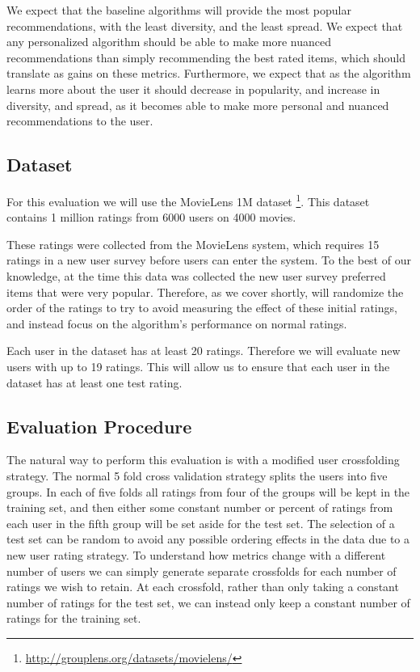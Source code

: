 \documentclass[letterpaper]{sig-alternate}
\begin{document}
  We expect that the baseline algorithms will provide the most popular recommendations, with the least diversity, and the least spread.
  We expect that any personalized algorithm should be able to make more nuanced recommendations than simply recommending the best rated items, which should translate as gains on these metrics.
  Furthermore, we expect that as the algorithm learns more about the user it should decrease in popularity, and increase in diversity, and spread, as it becomes able to make more personal and nuanced recommendations to the user.


  \subsection*{Dataset}

  For this evaluation we will use the MovieLens 1M dataset \footnote{\url{http://grouplens.org/datasets/movielens/}}.
  This dataset contains 1 million ratings from 6000 users on 4000 movies.
  
  These ratings were collected from the MovieLens system, which requires 15 ratings in a new user survey before users can enter the system.
  To the best of our knowledge, at the time this data was collected the new user survey preferred items that were very popular.
  Therefore, as we cover shortly, will randomize the order of the ratings to try to avoid measuring the effect of these initial ratings, and instead focus on the algorithm's performance on normal ratings.
  
  Each user in the dataset has at least 20 ratings.
  Therefore we will evaluate new users with up to 19 ratings.
  This will allow us to ensure that each user in the dataset has at least one test rating.

  
  \subsection*{Evaluation Procedure}

  The natural way to perform this evaluation is with a modified user crossfolding strategy.
  The normal 5 fold cross validation strategy splits the users into five groups.
  In each of five folds all ratings from four of the groups will be kept in the training set, and then either some constant number or percent of ratings from each user in the fifth group will be set aside for the test set.
  The selection of a test set can be random to avoid any possible ordering effects in the data due to a new user rating strategy.
  To understand how metrics change with a different number of users we can simply generate separate crossfolds for each number of ratings we wish to retain.
  At each crossfold, rather than only taking a constant number of ratings for the test set, we can instead only keep a constant number of ratings for the training set.
  
\end{document}
